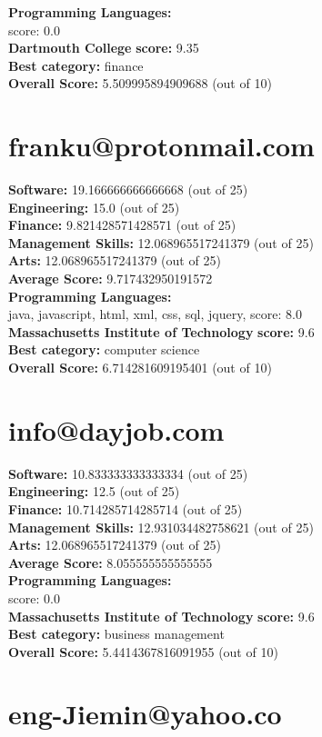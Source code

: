 \documentclass{article}
\begin{document}
\textbf{Programming Languages:} \\
score: 0.0\\
\textbf{Dartmouth College} \textbf{score:} 9.35\\
\textbf{Best category: } finance\\
\textbf{Overall Score: }5.509995894909688 (out of 10)\section{franku@protonmail.com}
\textbf{Software:} 19.166666666666668 (out of 25)\\
\textbf{Engineering: } 15.0 (out of 25)\\
\textbf{Finance:} 9.821428571428571 (out of 25)\\
\textbf{Management Skills:} 12.068965517241379 (out of 25)\\
\textbf{Arts:} 12.068965517241379 (out of 25)\\
\textbf{Average Score: } 9.717432950191572\\
\textbf{Programming Languages:} \\
java, javascript, html, xml, css, sql, jquery, score: 8.0\\
\textbf{Massachusetts Institute of Technology} \textbf{score:} 9.6\\
\textbf{Best category: } computer science\\
\textbf{Overall Score: }6.714281609195401 (out of 10)\section{info@dayjob.com}
\textbf{Software:} 10.833333333333334 (out of 25)\\
\textbf{Engineering: } 12.5 (out of 25)\\
\textbf{Finance:} 10.714285714285714 (out of 25)\\
\textbf{Management Skills:} 12.931034482758621 (out of 25)\\
\textbf{Arts:} 12.068965517241379 (out of 25)\\
\textbf{Average Score: } 8.055555555555555\\
\textbf{Programming Languages:} \\
score: 0.0\\
\textbf{Massachusetts Institute of Technology} \textbf{score:} 9.6\\
\textbf{Best category: } business management\\
\textbf{Overall Score: }5.4414367816091955 (out of 10)\section{eng-Jiemin@yahoo.co}
\end{document}
